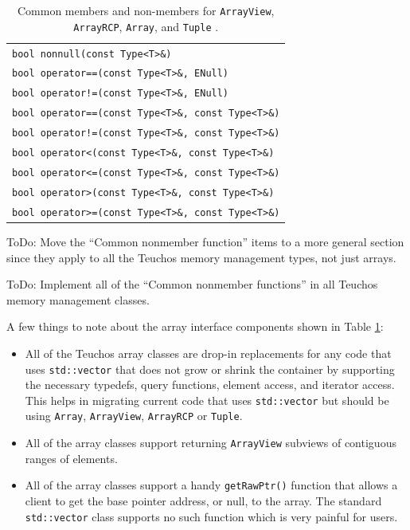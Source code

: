 \documentclass[pdf,ps2pdf,11pt]{SANDreport}
\begin{document}
\begin{table}
{\begin{center}
\begin{tabular}{|l|}
{}\texttt{bool nonnull(const Type<T>\&)} \\
{}\texttt{bool operator==(const Type<T>\&, ENull)} \\
{}\texttt{bool operator!=(const Type<T>\&, ENull)} \\
{}\texttt{bool operator==(const Type<T>\&, const Type<T>\&)} \\
{}\texttt{bool operator!=(const Type<T>\&, const Type<T>\&)} \\
{}\texttt{bool operator<(const Type<T>\&, const Type<T>\&)} \\
{}\texttt{bool operator<=(const Type<T>\&, const Type<T>\&)} \\
{}\texttt{bool operator>(const Type<T>\&, const Type<T>\&)} \\
{}\texttt{bool operator>=(const Type<T>\&, const Type<T>\&)} \\
\hline
\end{tabular}
\caption{\label{tbl:common-array-type-members}
Common members and non-members for {}\texttt{ArrayView},
{}\texttt{ArrayRCP}, {}\texttt{Array}, and {}\texttt{Tuple} .}
\end{center}}
\end{table}

ToDo: Move the ``Common nonmember function'' items to a more general
section since they apply to all the Teuchos memory management types,
not just arrays.

ToDo: Implement all of the ``Common nonmember functions'' in all
Teuchos memory management classes.

A few things to note about the array interface components shown in
Table {}\ref{tbl:common-array-type-members}:

\begin{itemize}

{}\item{}All of the Teuchos array classes are drop-in replacements for
any code that uses {}\texttt{std::vector} that does not grow or shrink
the container by supporting the necessary typedefs, query functions,
element access, and iterator access.  This helps in migrating current
code that uses {}\texttt{std::vector} but should be using
{}\texttt{Array}, {}\texttt{ArrayView}, {}\texttt{ArrayRCP} or
{}\texttt{Tuple}.

{}\item{}All of the array classes support returning \texttt{ArrayView}
subviews of contiguous ranges of elements.

{}\item{}All of the array classes support a handy
{}\texttt{getRawPtr()} function that allows a client to get the base
pointer address, or null, to the array.  The standard
{}\texttt{std::vector} class supports no such function which is very
painful for users.

\end{itemize}
\end{document}
